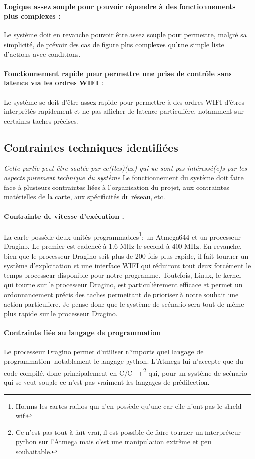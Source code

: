 \paragraph{Logique assez souple pour pouvoir répondre à des fonctionnements plus complexes :}
Le système doit en revanche pouvoir être assez souple pour permettre, malgré sa simplicité, de prévoir des cas de figure plus complexes qu'une simple liste d'actions avec conditions.
\paragraph{Fonctionnement rapide pour permettre une prise de contrôle sans latence via les ordres WIFI :}
Le système se doit d'être assez rapide pour permettre à des ordres WIFI d'êtres interprétés rapidement et ne pas afficher de latence particulière, notamment sur certaines taches précises.

\subsection{Contraintes techniques identifiées}
\indent \textit{Cette partie peut-être sautée par ce(lles)(ux) qui ne sont pas intéressé(e)s par les aspects purement technique du système}\p
Le fonctionnement du système doit faire face à plusieurs contraintes liées à l'organisation du projet, aux contraintes matérielles de la carte, aux spécificités du réseau, etc.
\paragraph{Contrainte de vitesse d'exécution :}
La carte possède deux unités programmables\footnote{Hormis les cartes radios qui n'en possède qu'une car elle n'ont pas le shield wifi}: un Atmega644 et un processeur Dragino. Le premier est cadencé à 1.6 MHz le second à 400 MHz. En revanche, bien que le processeur Dragino soit plus de 200 fois plus rapide, il fait tourner un système d'exploitation et une interface WIFI qui réduiront tout deux forcément le temps processeur disponible pour notre programme. Toutefois, Linux, le kernel qui tourne sur le processeur Dragino, est particulièrement efficace et permet un ordonnancement précis des taches permettant de prioriser à notre souhait une action particulière. Je pense donc que le système de scénario sera tout de même plus rapide sur le processeur Dragino.
\paragraph{Contrainte liée au langage de programmation}
Le processeur Dragino permet d'utiliser n'importe quel langage de programmation, notablement le langage python. L'Atmega lui n'accepte que du code compilé, donc principalement en C/C++\footnote{Ce n'est pas tout à fait vrai, il est possible de faire tourner un interpréteur python sur l'Atmega mais c'est une manipulation extrême et peu souhaitable.} qui, pour un système de scénario qui se veut souple ce n'est pas vraiment les langages de prédilection.
